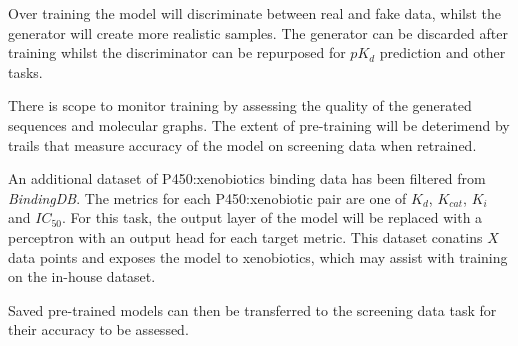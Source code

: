 \documentclass{article}
\begin{document}
Over training the model will discriminate between real and fake data, whilst the generator will create more realistic samples. The generator can be discarded after training whilst the discriminator can be repurposed for $pK_d$ prediction and other tasks. %
\par
There is scope to monitor training by assessing the quality of the generated sequences and molecular graphs. %
The extent of pre-training will be deterimend by trails that measure accuracy of the model on screening data when retrained. %
\par
An additional dataset of P450:xenobiotics binding data has been filtered from \textit{BindingDB}. The metrics for each P450:xenobiotic pair are one of $K_d$, $K_{cat}$, $K_i$ and $IC_{50}$. For this task, the output layer of the model will be replaced with a perceptron with an output head for each target metric. This dataset conatins $X$ data points and exposes the model to xenobiotics, which may assist with training on the in-house dataset. %
\par
Saved pre-trained models can then be transferred to the screening data task for their accuracy to be assessed. %
\end{document}
